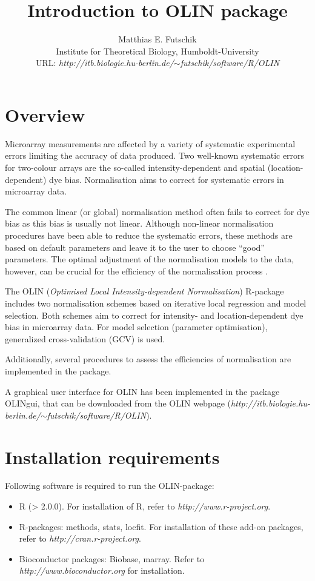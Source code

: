 \documentclass[a4paper,11pt]{article}
\title{Introduction to OLIN package}
\author{Matthias E. Futschik\\ Institute for Theoretical Biology,  Humboldt-University\\ URL: \textit{http://itb.biologie.hu-berlin.de/$\sim$futschik/software/R/OLIN}}
\begin{document}
\maketitle
\tableofcontents

\section{Overview}
Microarray measurements are affected by a variety of systematic experimental errors 
limiting the accuracy of data produced. 
Two well-known systematic errors for two-colour arrays are    
the so-called intensity-dependent and spatial (location-dependent) dye bias. 
Normalisation aims to correct for systematic errors in microarray data.

The common linear (or global) normalisation method  often fails to correct for dye  bias 
as this bias is usually not linear.  Although non-linear normalisation procedures have been 
able to reduce the systematic errors,
these methods are based on default parameters and leave it to the user to choose ``good'' 
parameters. The optimal adjustment of the normalisation models to the data, however,
can be crucial for the efficiency of the normalisation process \cite{toni}. 

The OLIN (\textit{Optimised Local Intensity-dependent Normalisation})  
R-package includes two normalisation schemes based on iterative  local regression
and model selection. Both  schemes aim to correct for intensity- and location-dependent  dye bias in  microarray data. For model selection (parameter optimisation), generalized cross-validation (GCV) is used. 

Additionally, several procedures to assess the efficiencies of normalisation are implemented
in the package. 

A graphical user interface for OLIN has been implemented in the package OLINgui, that
can be downloaded from the OLIN webpage (\textit{http://itb.biologie.hu-berlin.de/$\sim$futschik/software/R/OLIN}).

\section{Installation requirements}
Following software is required to run the OLIN-package:
\begin{itemize} 
\item  R (> 2.0.0). For installation of R, refer to \textit{http://www.r-project.org}.
\item  R-packages: methods, stats, locfit. For installation of these add-on packages, refer to \textit{http://cran.r-project.org}.
\item Bioconductor packages: Biobase, marray. Refer to \textit{http://www.bioconductor.org} for installation. 
\end{itemize}
\end{document}
